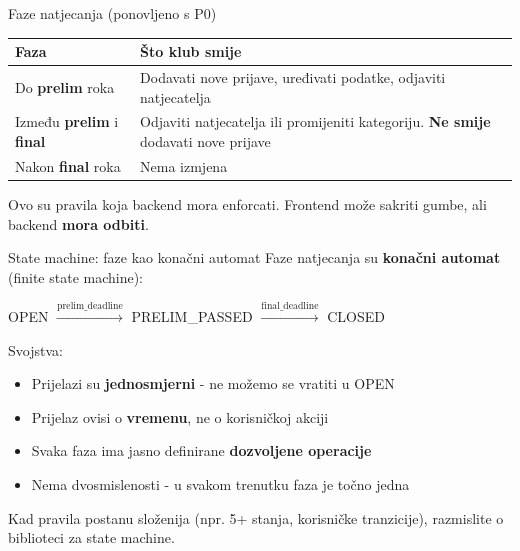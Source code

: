 \begin{frame}{Faze natjecanja (ponovljeno s P0)}
\begin{tabular}{@{}lp{9cm}@{}}
  \toprule
  \textbf{Faza} & \textbf{Što klub smije} \\
  \midrule
  Do \textbf{prelim} roka & Dodavati nove prijave, uređivati podatke, odjaviti natjecatelja \\
  \midrule
  Između \textbf{prelim} i \textbf{final} & Odjaviti natjecatelja ili promijeniti kategoriju. \textbf{Ne smije} dodavati nove prijave \\
  \midrule
  Nakon \textbf{final} roka & Nema izmjena \\
  \bottomrule
\end{tabular}

\vspace{0.6em}
Ovo su pravila koja backend mora enforcati. Frontend može sakriti gumbe, ali backend \textbf{mora odbiti}.
\end{frame}

\begin{frame}{State machine: faze kao konačni automat}
Faze natjecanja su \textbf{konačni automat} (finite state machine):

\vspace{0.6em}
\begin{center}
OPEN $\xrightarrow{\text{prelim\_deadline}}$ PRELIM\_PASSED $\xrightarrow{\text{final\_deadline}}$ CLOSED
\end{center}

\vspace{0.6em}
Svojstva:
\begin{itemize}
  \item Prijelazi su \textbf{jednosmjerni} - ne možemo se vratiti u OPEN
  \item Prijelaz ovisi o \textbf{vremenu}, ne o korisničkoj akciji
  \item Svaka faza ima jasno definirane \textbf{dozvoljene operacije}
  \item Nema dvosmislenosti - u svakom trenutku faza je točno jedna
\end{itemize}

\vspace{0.4em}
Kad pravila postanu složenija (npr. 5+ stanja, korisničke tranzicije), razmislite o biblioteci za state machine.
\end{frame}

